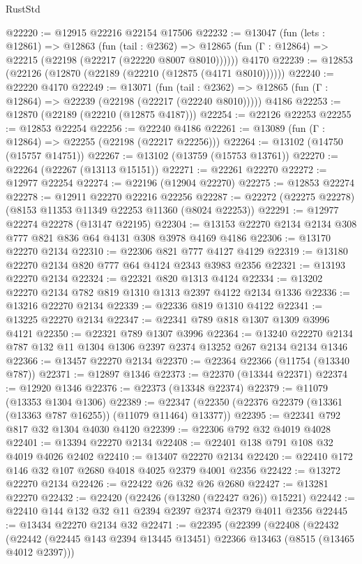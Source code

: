 \begin{lexlean}{RustStd}
\begin{coremodule}
@22220 := @12915 @22216 @22154 @17506
@22232 := @13047
    (fun (lets : @12861) =>
    @12863
      (fun (tail : @2362) =>
      @12865 (fun (Γ : @12864) => @22215 (@22198 (@22217 (@22220 @8007 @8010))))))
    @4170
@22239 := @12853 (@22126 (@12870 (@22189 (@22210 (@12875 (@4171 @8010))))))
@22240 := @22220 @4170
@22249 := @13071
    (fun (tail : @2362) => @12865 (fun (Γ : @12864) => @22239 (@22198 (@22217 (@22240 @8010)))))
    @4186
@22253 := @12870 (@22189 (@22210 (@12875 @4187)))
@22254 := @22126 @22253
@22255 := @12853 @22254
@22256 := @22240 @4186
@22261 := @13089 (fun (Γ : @12864) => @22255 (@22198 (@22217 @22256)))
@22264 := @13102 (@14750 (@15757 @14751))
@22267 := @13102 (@13759 (@15753 @13761))
@22270 := @22264 (@22267 (@13113 @15151))
@22271 := @22261 @22270
@22272 := @12977 @22254
@22274 := @22196 (@12904 @22270)
@22275 := @12853 @22274
@22278 := @12911 @22270 @22216 @22256
@22287 := @22272 (@22275 @22278) (@8153 @11353 @11349 @22253 @11360 (@8024 @22253))
@22291 := @12977 @22274 @22278 (@13147 @22195)
@22304 := @13153 @22270 @2134 @2134 @308 @777 @821 @836 @64 @4131 @308 @3978 @4169 @4186
@22306 := @13170 @22270 @2134
@22310 := @22306 @821 @777 @4127 @4129
@22319 := @13180 @22270 @2134 @820 @777 @64 @4124 @2343 @3983 @2356
@22321 := @13193 @22270 @2134
@22324 := @22321 @820 @1313 @4124
@22334 := @13202 @22270 @2134 @782 @819 @1310 @1313 @2397 @4122 @2134 @1336
@22336 := @13216 @22270 @2134
@22339 := @22336 @819 @1310 @4122
@22341 := @13225 @22270 @2134
@22347 := @22341 @789 @818 @1307 @1309 @3996 @4121
@22350 := @22321 @789 @1307 @3996
@22364 := @13240 @22270 @2134 @787 @132 @11 @1304 @1306 @2397 @2374 @13252 @267 @2134 @2134 @1346
@22366 := @13457 @22270 @2134
@22370 := @22364 @22366 (@11754 (@13340 @787))
@22371 := @12897 @1346
@22373 := @22370 (@13344 @22371)
@22374 := @12920 @1346
@22376 := @22373 (@13348 @22374)
@22379 := @11079 (@13353 @1304 @1306)
@22389 := @22347 (@22350 (@22376 @22379 (@13361 (@13363 @787 @16255)) (@11079 @11464) @13377))
@22395 := @22341 @792 @817 @32 @1304 @4030 @4120
@22399 := @22306 @792 @32 @4019 @4028
@22401 := @13394 @22270 @2134
@22408 := @22401 @138 @791 @108 @32 @4019 @4026 @2402
@22410 := @13407 @22270 @2134
@22420 := @22410 @172 @146 @32 @107 @2680 @4018 @4025 @2379 @4001 @2356
@22422 := @13272 @22270 @2134
@22426 := @22422 @26 @32 @26 @2680
@22427 := @13281 @22270
@22432 := @22420 (@22426 (@13280 (@22427 @26)) @15221)
@22442 := @22410 @144 @132 @32 @11 @2394 @2397 @2374 @2379 @4011 @2356
@22445 := @13434 @22270 @2134 @32
@22471 := @22395
    (@22399
      (@22408
        (@22432
          (@22442 (@22445 @143 @2394 @13445 @13451) @22366 @13463 (@8515 (@13465 @4012 @2397)))

\end{coremodule}
\end{lexlean}
